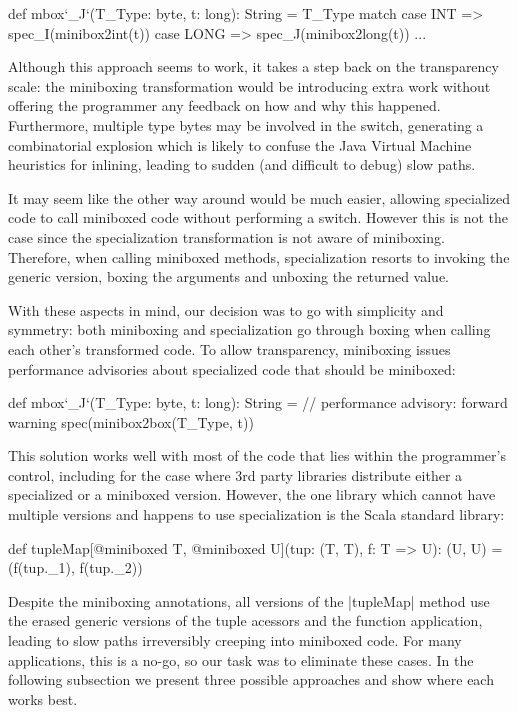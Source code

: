 \begin{lstlisting-nobreak}
 def mbox`_J`(T_Type: byte, t: long): String =
   T_Type match {
     case INT => spec_I(minibox2int(t))
     case LONG => spec_J(minibox2long(t))
     ...
   }
\end{lstlisting-nobreak}

Although this approach seems to work, it takes a step back on the transparency scale: the miniboxing transformation would be introducing extra work without offering the programmer any feedback on how and why this happened. Furthermore, multiple type bytes may be involved in the switch, generating a combinatorial explosion which is likely to confuse the Java Virtual Machine heuristics for inlining, leading to sudden (and difficult to debug) slow paths.

It may seem like the other way around would be much easier, allowing specialized code to call miniboxed code without performing a switch. However this is not the case since the specialization transformation is not aware of miniboxing. Therefore, when calling miniboxed methods, specialization resorts to invoking the generic version, boxing the arguments and unboxing the returned value.

With these aspects in mind, our decision was to go with simplicity and symmetry: both miniboxing and specialization go through boxing when calling each other's transformed code. To allow transparency, miniboxing issues performance advisories about specialized code that should be miniboxed:

\begin{lstlisting-nobreak}
 def mbox`_J`(T_Type: byte, t: long): String =
   // performance advisory: forward warning
   spec(minibox2box(T_Type, t))
\end{lstlisting-nobreak}

This solution works well with most of the code that lies within the programmer's control, including for the case where 3rd party libraries distribute either a specialized or a miniboxed version. However, the one library which cannot have multiple versions and happens to use specialization is the Scala standard library:

\begin{lstlisting-nobreak}
 def tupleMap[@miniboxed T, @miniboxed U](tup: (T, T), f: T => U): (U, U) =
   (f(tup._1), f(tup._2))
\end{lstlisting-nobreak}

Despite the miniboxing annotations, all versions of the |tupleMap| method use the erased generic versions of the tuple acessors and the function application, leading to slow paths irreversibly creeping into miniboxed code. For many applications, this is a no-go, so our task was to eliminate these cases. In the following subsection we present three possible approaches and show where each works best.

